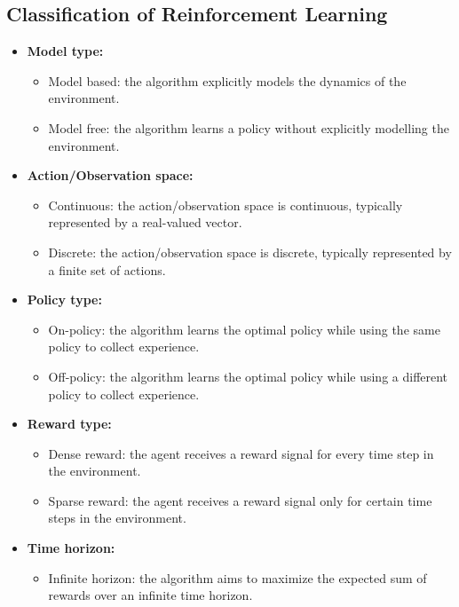 \subsection{Classification of Reinforcement Learning}
\begin{itemize}

    \item \textbf{Model type:}
    \begin{itemize}
    \item Model based: the algorithm explicitly models the dynamics of the environment.
    \item Model free: the algorithm learns a policy without explicitly modelling the environment.
    \end{itemize}
    \item \textbf{Action/Observation space:}
    \begin{itemize}
    \item Continuous: the action/observation space is continuous, typically represented by a real-valued vector.
    \item Discrete: the action/observation space is discrete, typically represented by a finite set of actions.
    \end{itemize}
    \item \textbf{Policy type:}
    \begin{itemize}
    \item On-policy: the algorithm learns the optimal policy while using the same policy to collect experience.
    \item Off-policy: the algorithm learns the optimal policy while using a different policy to collect experience.
    \end{itemize}
    \item \textbf{Reward type:}
    \begin{itemize}
    \item Dense reward: the agent receives a reward signal for every time step in the environment.
    \item Sparse reward: the agent receives a reward signal only for certain time steps in the environment.
    \end{itemize}
    \item \textbf{Time horizon:}
    \begin{itemize}
    \item Infinite horizon: the algorithm aims to maximize the expected sum of rewards over an infinite time horizon.

\end{itemize}
\end{itemize}
